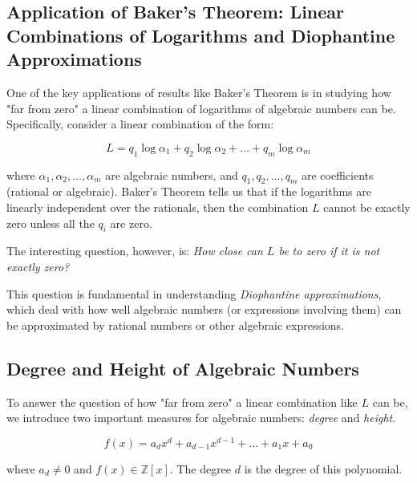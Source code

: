 \documentclass{article}
\begin{document}
\subsection{Application of Baker's Theorem: Linear Combinations of Logarithms and Diophantine Approximations}

One of the key applications of results like Baker's Theorem is in studying how "far from zero" a linear combination of logarithms of algebraic numbers can be. Specifically, consider a linear combination of the form:

\[
L = q_1 \log \alpha_1 + q_2 \log \alpha_2 + \dots + q_m \log \alpha_m
\]

where $\alpha_1, \alpha_2, \dots, \alpha_m$ are algebraic numbers, and $q_1, q_2, \dots, q_m$ are coefficients (rational or algebraic). Baker's Theorem tells us that if the logarithms are linearly independent over the rationals, then the combination $L$ cannot be exactly zero unless all the $q_i$ are zero.

The interesting question, however, is: \emph{How close can $L$ be to zero if it is not exactly zero?}

This question is fundamental in understanding \emph{Diophantine approximations}, which deal with how well algebraic numbers (or expressions involving them) can be approximated by rational numbers or other algebraic expressions.


\subsection{Degree and Height of Algebraic Numbers}

To answer the question of how "far from zero" a linear combination like $L$ can be, we introduce two important measures for algebraic numbers: \emph{degree} and \emph{height}.

\[
f(x) = a_d x^d + a_{d-1} x^{d-1} + \dots + a_1 x + a_0
\]

where $a_d \neq 0$ and $f(x) \in \mathbb{Z}[x]$. The degree $d$ is the degree of this polynomial.

\end{document}
